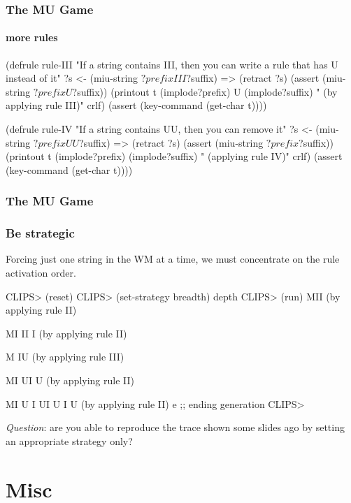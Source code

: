 \documentclass[xcolor={usenames,dvipsnames,svgnames}, compress]{beamer}
\begin{document}
\begin{frame}[fragile]
  \frametitle{The MU Game}
  \framesubtitle{more rules}

  \begin{clips-code}[numbers=none]
    (defrule rule-III
        "If a string contains III, 
            then you can write a rule that has U instead of it"
        ?s <- (miu-string $?prefix I I I $?suffix)
        =>
        (retract ?s)
        (assert (miu-string $?prefix U $?suffix))
        (printout t (implode$ $?prefix) U (implode$ $?suffix)
            " (by applying rule III)" crlf)
        (assert (key-command (get-char t))))
  \end{clips-code} 
  \begin{clips-code}[numbers=none]
    (defrule rule-IV
        "If a string contains UU, then you can remove it"
        ?s <- (miu-string $?prefix U U $?suffix)
        =>
        (retract ?s)
        (assert (miu-string $?prefix $?suffix))
        (printout t (implode$ $?prefix) (implode$ $?suffix)
            " (applying rule IV)" crlf)
        (assert (key-command (get-char t))))  \end{clips-code}
\end{frame}

\begin{frame}[fragile]
  \frametitle{The MU Game}
  \frametitle{Be strategic}
  Forcing just one string in the WM at a time, we must concentrate on
  the rule activation order.
  \begin{clips-code}
    CLIPS> (reset)
    CLIPS> (set-strategy breadth)
    depth
    CLIPS> (run)
    MII (by applying rule II)

    MI II I (by applying rule II)

    M IU (by applying rule III)

    MI UI U (by applying rule II)

    MI U I UI U I U (by applying rule II)
    e ;; ending generation
    CLIPS>
  \end{clips-code}

  \emph{Question}: are you able to reproduce the trace shown some slides ago by setting
  an appropriate strategy only?
\end{frame}

\section{Misc}
{
  \begin{frame}
    \sectionpage
  \end{frame}
}
\end{document}
